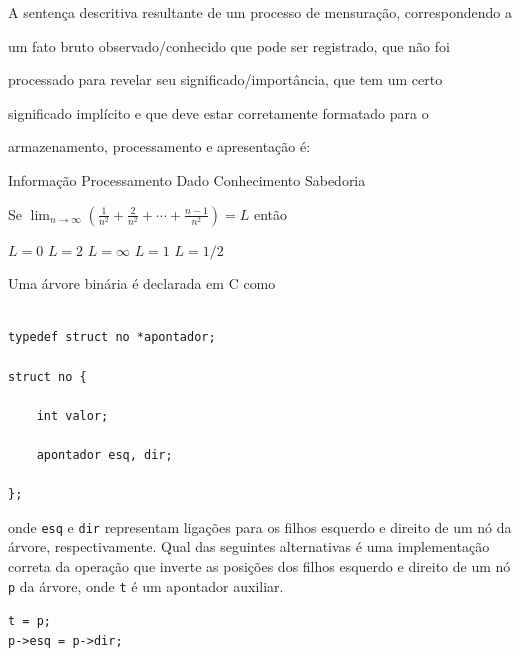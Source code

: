 \documentclass[12pt, addpoints]{exam}
\begin{document}
\begin{questions}
\question

A sentença descritiva resultante de um processo de mensuração, correspondendo a

um fato bruto observado/conhecido que pode ser registrado, que não foi

processado para revelar seu significado/importância, que tem um certo

significado implícito e que deve estar corretamente formatado para o

armazenamento, processamento e apresentação é:
\begin{choices}
\choice Informação
\choice Processamento
\choice Dado
\choice Conhecimento
\choice Sabedoria
\end{choices}

\question

Se \( \lim_{n \to \infty} \left( \frac{1}{n^2} + \frac{2}{n^2} + \cdots + \frac{n-1}{n^2} \right) = L \) então


\begin{choices}
\choice \( L = 0 \)
\choice \( L = 2 \)
\choice \( L = \infty \)
\choice \( L = 1 \)
\choice \( L = 1/2 \)
\end{choices}

\question

Uma árvore binária é declarada em C como



\begin{verbatim}

typedef struct no *apontador;

struct no {

    int valor;

    apontador esq, dir;

};

\end{verbatim}



onde \texttt{esq} e \texttt{dir} representam ligações para os filhos esquerdo e direito de um nó da árvore, respectivamente. Qual das seguintes alternativas é uma implementação correta da operação que inverte as posições dos filhos esquerdo e direito de um nó \texttt{p} da árvore, onde \texttt{t} é um apontador auxiliar.


\begin{choices}
\choice \texttt{t = p;} \\

          \texttt{p->esq = p->dir;} \\


\end{choices}
\end{questions}
\end{document}
